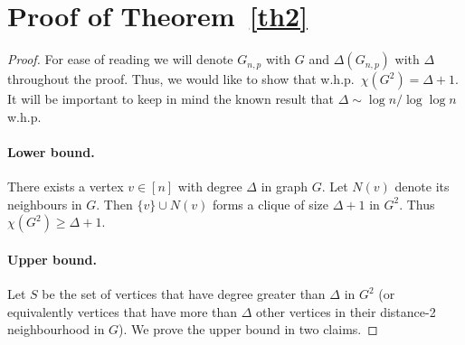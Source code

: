 \documentclass[12pt,a4paper]{article}
\theoremstyle{plain}
\begin{document}
\section{Proof of Theorem~\ref{th2}}\label{chi2}
\begin{proof}
For ease of reading we will denote $G_{n, p}$ with $G$ and $\Delta(G_{n, p})$ with $\Delta$ throughout the proof. Thus, we would like to show that w.h.p.~$\chi(G^2) = \Delta + 1$.
It will be important to keep in mind the known result that $\Delta \sim \log n/\log\log n$ w.h.p.
\paragraph{Lower bound.} There exists a vertex $v \in [n]$ with degree $\Delta$ in graph $G$. Let $N(v)$ denote its neighbours in $G$. Then $\{v\} \cup N(v)$ forms a clique of size $\Delta + 1$ in $G^2$. Thus $\chi(G^2) \geq \Delta + 1$. 

\paragraph{Upper bound.}
Let $S$ be the set of vertices that have degree greater than $\Delta$ in $G^2$ (or equivalently vertices that have more than $\Delta$ other vertices in their distance-2 neighbourhood in $G$). We prove the upper bound in two claims.


\end{proof}
\end{document}

